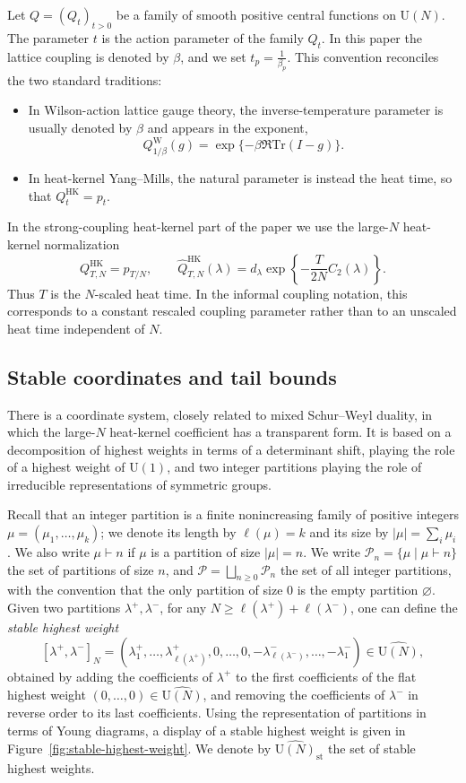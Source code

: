 \documentclass[11pt,a4paper,reqno]{amsart}
\theoremstyle{definition}
\theoremstyle{remark}
\newcommand\U{{\mathrm U}}
\newcommand\Tr{{\mathrm{Tr}}}
\newcommand\HK{{\mathrm{HK}}}
\newcommand\Pfr{{\mathcal{P}}}
\begin{document}
Let $Q=(Q_t)_{t>0}$ be a family of smooth positive central functions on $\U(N)$.  The parameter $t$ is the action parameter of the family $Q_t$.  In this paper the lattice coupling is denoted by $\beta$, and we set $t_p=\frac1{\beta_p}.$ This convention reconciles the two standard traditions:
\begin{itemize}
\item In Wilson-action lattice gauge theory, the inverse-temperature parameter is usually denoted by $\beta$ and appears in the exponent,
\[
Q^{\mathrm W}_{1/\beta}(g)=\exp\{-\beta\Re\Tr(I-g)\}.
\]
\item In heat-kernel Yang--Mills, the natural parameter is instead the heat time, so that $Q_t^{\HK}=p_t$.
\end{itemize}
In the strong-coupling heat-kernel part of the paper we use the large-$N$ heat-kernel normalization
\begin{equation}\label{eq:Fourier-coef-HK}
Q^{\HK}_{T,N}=p_{T/N},
\qquad
\widehat Q^{\HK}_{T,N}(\lambda)=d_\lambda\exp\left\{-\frac{T}{2N}C_2(\lambda)\right\}.
\end{equation}
Thus $T$ is the $N$-scaled heat time.  In the informal coupling notation, this corresponds to a constant rescaled coupling parameter rather than to an unscaled heat time independent of $N$.

\subsection{Stable coordinates and tail bounds}

There is a coordinate system, closely related to mixed Schur--Weyl duality, in which the large-$N$ heat-kernel coefficient has a transparent form. It is based on a decomposition of highest weights in terms of a determinant shift, playing the role of a highest weight of $\U(1)$, and two integer partitions playing the role of irreducible representations of symmetric groups.

Recall that an integer partition is a finite nonincreasing family of positive integers $\mu=(\mu_1,\ldots,\mu_k)$; we denote its length by $\ell(\mu)=k$ and its size by $\vert\mu\vert=\sum_i\mu_i$. We also write $\mu\vdash n$ if $\mu$ is a partition of size $\vert\mu\vert=n$. We write $\Pfr_n=\{\mu\mid \mu\vdash n\}$ the set of partitions of size $n$, and $\Pfr=\bigsqcup_{n\geq 0}\Pfr_n$ the set of all integer partitions, with the convention that the only partition of size $0$ is the empty partition $\varnothing.$ Given two partitions $\lambda^+,\lambda^-$, for any $N\geq \ell(\lambda^+)+\ell(\lambda^-)$, one can define the \emph{stable highest weight}
\[
[\lambda^+,\lambda^-]_N=(\lambda_1^+,\ldots,\lambda_{\ell(\lambda^+)}^+,0,\ldots,0,-\lambda_{\ell(\lambda^-)}^-,\ldots,-\lambda_1^-)\in\widehat{\U(N)},
\]
obtained by adding the coefficients of $\lambda^+$ to the first coefficients of the flat highest weight $(0,\ldots,0)\in\widehat{\U(N)}$, and removing the coefficients of $\lambda^-$ in reverse order to its last coefficients. Using the representation of partitions in terms of Young diagrams, a display of a stable highest weight is given in Figure~\ref{fig:stable-highest-weight}. We denote by $\widehat{\U(N)}_{\mathrm{st}}$ the set of stable highest weights.
\end{document}
